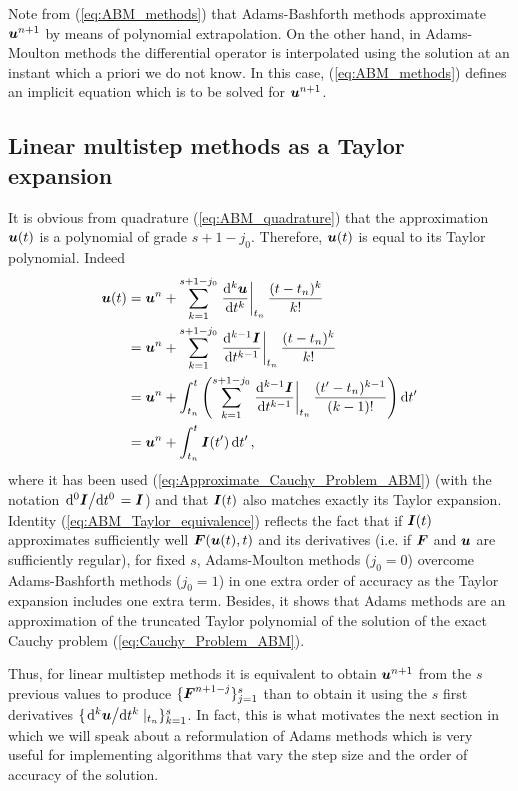 Note from (\ref{eq:ABM_methods}) that Adams-Bashforth methods approximate $\boldsymbol{u}^{n+1}$ by means of polynomial extrapolation. On the other hand, in Adams-Moulton methods the differential operator is interpolated using the solution at an instant which a priori we do not know. In this case, (\ref{eq:ABM_methods}) defines an implicit equation which is to be solved for $\boldsymbol{u}^{n+1}$.



\subsection{Linear multistep methods as a Taylor expansion}
It is obvious from quadrature (\ref{eq:ABM_quadrature}) that the approximation $\boldsymbol{u}(t)$ is a polynomial of grade $s+1-j_0$. Therefore, $\boldsymbol{u}(t)$ is equal to its Taylor polynomial. Indeed
%
\begin{align}
	\vect{u}(t)
	& =
	\vect{u}^n
	+
	\sum_{k = 1}^{s+1-j_0}
	\eval{ \dv[k]{\vect{u}}{t} }_{t_n}
	\frac{(t-t_n)^k}{k!}
	\nonumber 
	\\
	& =
	\vect{u}^n
	+
	\sum_{k = 1}^{s+1-j_0}
	\eval{ \dv[k-1]{\vect{I}}{t} }_{t_n}
	\frac{(t-t_n)^k}{k!}
	\nonumber 
	\\
	& =
	\vect{u}^n
	+
	\int_{t_n}^{t}
	\left(
	\sum_{k = 1}^{s+1-j_0}
	\eval{ \dv[k-1]{\vect{I}}{t} }_{t_n}
	\frac{(t'-t_n)^{k-1}}{(k-1)!}
	\right)
	\dd{t'}
	\nonumber 
	\\
	& =
	\vect{u}^n
	+
	\int_{t_n}^{t}
	\vect{I}(t')
	\dd{t'},
	\label{eq:ABM_Taylor_equivalence}
\end{align}
where it has been used (\ref{eq:Approximate_Cauchy_Problem_ABM}) (with the notation $\dv*[0]{\boldsymbol{I}}{t}=\boldsymbol{I}$) and that $\boldsymbol{I}(t)$ also matches exactly its Taylor expansion. Identity (\ref{eq:ABM_Taylor_equivalence}) reflects the fact that if $\boldsymbol{I}(t)$ approximates sufficiently well $\boldsymbol{F}(\boldsymbol{u}(t),t)$ and its derivatives (i.e. if $\boldsymbol{F}$ and $\boldsymbol{u}$ are sufficiently regular), for fixed $s$, Adams-Moulton methods ($j_0=0$) overcome Adams-Bashforth methods ($j_0=1$) in one extra order of accuracy as the Taylor expansion includes one extra term. Besides, it shows that Adams methods are an approximation of the truncated Taylor polynomial of the solution of the exact Cauchy problem (\ref{eq:Cauchy_Problem_ABM}).

Thus, for linear multistep methods it is equivalent to obtain $\boldsymbol{u}^{n+1}$ from the $s$ previous values to produce $\{\boldsymbol{F}^{n+1-j}\}_{j=1}^{s}$ than to obtain it using the $s$ first derivatives 
$\{  \dv*[k]{\boldsymbol{u}}{t} |_{t_n} \}_{k=1}^{s}$. In fact, this is what motivates the next section in which we will speak about a reformulation of Adams methods which is very useful for implementing algorithms that vary the step size and the order of accuracy of the solution.

